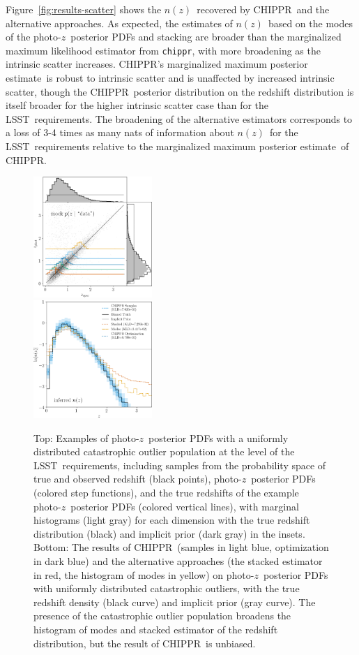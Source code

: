 \documentclass[iop]{emulateapj}
\newcommand{\Fig}[1]{Figure~\ref{#1}}
\newcommand{\project}[1]{\textsc{#1}}
\newcommand{\lsst}{\project{LSST}}
\newcommand{\Chippr}{\project{CHIPPR}}
\newcommand{\repo}[1]{\texttt{#1}}
\newcommand{\chippr}{\repo{chippr}}
\newcommand{\pz}{photo-$z$}
\newcommand{\pzpdf}{\pz\ posterior PDF}
\newcommand{\nz}{$n(z)$}
\newcommand{\mmle}{marginalized maximum posterior estimate}
\begin{document}
\Fig{fig:results-scatter} shows the \nz\ recovered by \Chippr\ and the alternative approaches.
As expected, the estimates of \nz\ based on the modes of the \pzpdf s and stacking are broader than the marginalized maximum likelihood estimator from \chippr, with more broadening as the intrinsic scatter increases.
\Chippr's \mmle\ is robust to intrinsic scatter and is unaffected by increased intrinsic scatter, though the \Chippr\ posterior distribution on the redshift distribution is itself broader for the higher intrinsic scatter case than for the \lsst\ requirements.
The broadening of the alternative estimators corresponds to a loss of 3-4 times as many nats of information about \nz\ for the \lsst\ requirements relative to the \mmle\ of \Chippr.

\begin{figure}
	\begin{center}
		\includegraphics[width=0.4\textwidth]{data_outlier_uniform.png}\\
		\includegraphics[width=0.4\textwidth]{results_outlier_uniform.png}
		\caption{
			Top: Examples of \pzpdf s with a uniformly distributed catastrophic outlier population at the level of the \lsst\ requirements, including samples from the probability space of true and observed redshift (black points), \pzpdf s (colored step functions), and the true redshifts of the example \pzpdf s (colored vertical lines), with marginal histograms (light gray) for each dimension with the true redshift distribution (black) and implicit prior (dark gray) in the insets.
			Bottom: The results of \Chippr\ (samples in light blue, optimization in dark blue) and the alternative approaches (the stacked estimator in red, the histogram of modes in yellow) on \pzpdf s with uniformly distributed catastrophic outliers, with the true redshift density (black curve) and implicit prior (gray curve).
			The presence of the catastrophic outlier population broadens the histogram of modes and stacked estimator of the redshift distribution, but the result of \Chippr\ is unbiased.
		}
		\label{fig:uniform-outliers}
	\end{center}
\end{figure}
\end{document}
